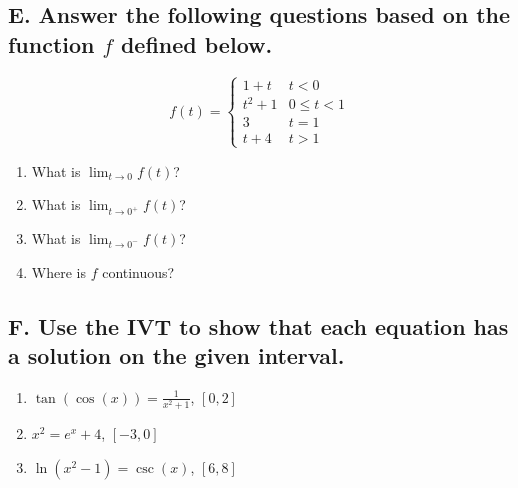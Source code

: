 \documentclass{article}
\begin{document}
\subsection*{E. Answer the following questions based on the function $f$ defined below.}
\begin{multicols}{2}
$$f(t)=\begin{cases}
1+t & t<0 \\
t^2+1 & 0 \leq t<1 \\ 
3 & t=1 \\
t+4 & t>1
\end{cases}$$
\columnbreak
\begin{enumerate}
\item What is $\displaystyle\lim_{t\to 0}f(t)$?
\item What is $\displaystyle\lim_{t\to 0^+}f(t)$?
\item What is $\displaystyle\lim_{t\to 0^-}f(t)$?
\item Where is $f$ continuous?
\end{enumerate}
\end{multicols}


\subsection*{F. Use the IVT to show that each equation has a solution on the given interval.}
\begin{multicols}{3}
\begin{enumerate}
    \item $\tan\left(\cos\left(x\right)\right)=\frac{1}{x^{2}+1}$, $[0, 2]$
    \item $x^{2}=e^{x}+4$, $[-3,0]$
    \item $\ln\left(x^{2}-1\right)=\csc\left(x\right)$, $[6,8]$
\end{enumerate}
\end{multicols}




\end{document}
